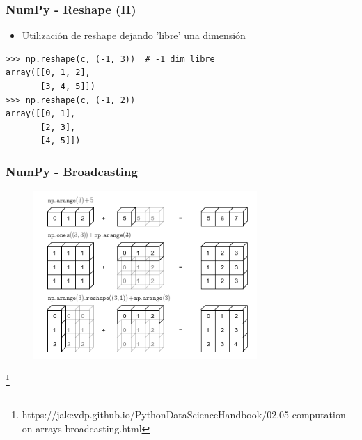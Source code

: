 \documentclass[18pt]{beamer}
\newcommand\blfootnote[1]{%
  \begingroup
  \renewcommand\thefootnote{}\footnote{#1}%
  \addtocounter{footnote}{-1}%
  \endgroup
}
\begin{document}
\begin{frame}[fragile]
	
	\frametitle{NumPy - Reshape (II)}
	
	\begin{itemize}
		\item Utilización de reshape dejando 'libre' una dimensión		
	\end{itemize}
	
	\begin{exampleblock}
		
    	\small
    	\begin{lstlisting}
>>> np.reshape(c, (-1, 3))  # -1 dim libre 
array([[0, 1, 2],
       [3, 4, 5]])
>>> np.reshape(c, (-1, 2))
array([[0, 1],
       [2, 3],
       [4, 5]])
		\end{lstlisting}

	\end{exampleblock}

\end{frame}


\begin{frame}
	
	\frametitle{NumPy - Broadcasting}

	\centering
	\begin{figure}
		\includegraphics[width=8.5cm]{images/numpy-broadcasting.png}
	\end{figure}
	
	\blfootnote{\scriptsize https://jakevdp.github.io/PythonDataScienceHandbook/02.05-computation-on-arrays-broadcasting.html}
\end{frame}
	
\end{document}
